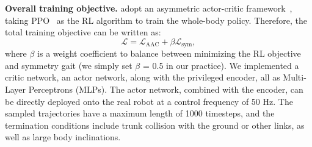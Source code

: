 \noindent\textbf{Overall training objective.}
\our adopt an asymmetric actor-critic framework~\citep{nahrendra2023dreamwaq}, taking PPO~\citep{schulman2017proximal} as the RL algorithm to train the whole-body policy. Therefore, the total training objective can be written as:
\begin{equation}\label{eq:total-obj}
\mathcal{L} = \mathcal{L}_\text{AAC} + \beta \mathcal{L}_\text{sym}, \end{equation}
where $\beta$ is a weight coefficient to balance between minimizing the RL objective and symmetry gait (we simply set $\beta$ = 0.5 in our practice). 
We implemented a critic network, an actor network, along with the privileged encoder, all as Multi-Layer Perceptrons (MLPs). The actor network, combined with the encoder, can be directly deployed onto the real robot at a control frequency of 50 Hz. The sampled trajectories have a maximum length of 1000 timesteps, and the termination conditions include trunk collision with the ground or other links, as well as large body inclinations.



